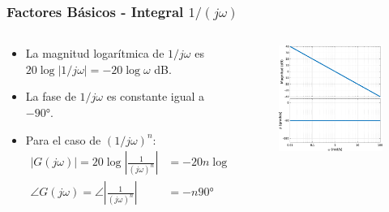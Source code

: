 \documentclass[aspectratio=169, handout]{beamer}
\theoremstyle{definition}
\theoremstyle{plain}
\theoremstyle{remark}
\begin{document}
\begin{frame}[<+->]\frametitle{Factores Básicos - Integral $1/(j\omega)$}
\begin{columns}
	\begin{column}{0.5\textwidth}
	\begin{itemize}
		\item La magnitud logarítmica de $1/j\omega$ es $20\log\left| 1/j\omega \right| = -20 \log \omega$ dB.
		\item La fase de $1/j\omega$ es constante igual a $-\ang{90}$.
		\item Para el caso de $(1/j\omega)^n$:
		\begin{align*}
		  \left| G(j\omega) \right| = 20 \log \left| \frac{1}{(j\omega)^n} \right| &= -20n\log\omega \text{ dB}\\
			\angle G(j\omega) = \angle \left| \frac{1}{(j\omega)^n} \right| &= -n\ang{90}
		\end{align*}
	\end{itemize}
	\end{column}
	\begin{column}{0.5\textwidth}
		\begin{figure}
			\includegraphics[width=6.5cm]{images/bodeIntegral.eps}
		\end{figure}
	\end{column}
\end{columns}
\end{frame}
\end{document}
